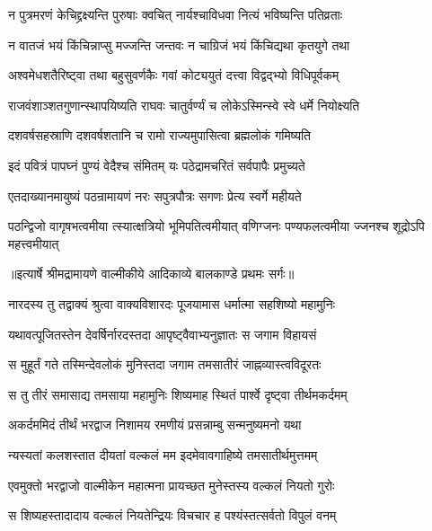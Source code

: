 \twolineshloka
{न पुत्रमरणं केचिद्द्रक्ष्यन्ति पुरुषाः क्वचित्}
{नार्यश्चाविधवा नित्यं भविष्यन्ति पतिव्रताः} %

\twolineshloka
{न वातजं भयं किंचिन्नाप्सु मज्जन्ति जन्तवः}
{न चाग्रिजं भयं किंचिद्यथा कृतयुगे तथा} %

\twolineshloka
{अश्वमेधशतैरिष्ट्वा तथा बहुसुवर्णकैः}
{गवां कोट्ययुतं दत्त्वा विद्वद्भ्यो विधिपूर्वकम्} %

\twolineshloka
{राजवंशाञ्शतगुणान्स्थापयिष्यति राघवः}
{चातुर्वर्ण्यं च लोकेऽस्मिन्स्वे स्वे धर्मे नियोक्ष्यति} %

\twolineshloka
{दशवर्षसहस्राणि दशवर्षशतानि च}
{रामो राज्यमुपासित्वा ब्रह्मलोकं गमिष्यति} %

\twolineshloka
{इदं पवित्रं पापघ्नं पुण्यं वेदैश्च संमितम्}
{यः पठेद्रामचरितं सर्वपापैः प्रमुच्यते} %

\twolineshloka
{एतदाख्यानमायुष्यं पठन्रामायणं नरः}
{सपुत्रपौत्रः सगणः प्रेत्य स्वर्गे महीयते} %

\fourlineindentedshloka
{पठन्द्विजो वागृषभत्वमीया}
{त्स्यात्क्षत्रियो भूमिपतित्वमीयात्}
{वणिग्जनः पण्यफलत्वमीया}
{ज्जनश्च शूद्रोऽपि महत्त्वमीयात्} %


{॥इत्यार्षे श्रीमद्रामायणे वाल्मीकीये आदिकाव्ये बालकाण्डे प्रथमः सर्गः॥}


\twolineshloka
{नारदस्य तु तद्वाक्यं श्रुत्वा वाक्यविशारदः}
{पूजयामास धर्मात्मा सहशिष्यो महामुनिः} %

\twolineshloka
{यथावत्पूजितस्तेन देवर्षिर्नारदस्तदा}
{आपृष्ट्वैवाभ्यनुज्ञातः स जगाम विहायसं} %

\twolineshloka
{स मुहूर्तं गते तस्मिन्देवलोकं मुनिस्तदा}
{जगाम तमसातीरं जाह्नव्यास्त्वविदूरतः} %

\twolineshloka
{स तु तीरं समासाद्य तमसाया महामुनिः}
{शिष्यमाह स्थितं पार्श्वे दृष्ट्वा तीर्थमकर्दमम्} %

\twolineshloka
{अकर्दममिदं तीर्थं भरद्वाज निशामय}
{रमणीयं प्रसन्नाम्बु सन्मनुष्यमनो यथा} %

\twolineshloka
{न्यस्यतां कलशस्तात दीयतां वल्कलं मम}
{इदमेवावगाहिष्ये तमसातीर्थमुत्तमम्} %

\twolineshloka
{एवमुक्तो भरद्वाजो वाल्मीकेन महात्मना}
{प्रायच्छत मुनेस्तस्य वल्कलं नियतो गुरोः} %

\twolineshloka
{स शिष्यहस्तादादाय वल्कलं नियतेन्द्रियः}
{विचचार ह पश्यंस्तत्सर्वतो विपुलं वनम्} %

